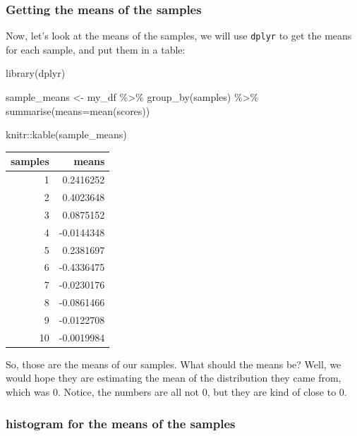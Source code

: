 \documentclass[
]{book}
\newenvironment{Shaded}{\begin{snugshade}}{\end{snugshade}}
\newcommand{\AttributeTok}[1]{\textcolor[rgb]{0.77,0.63,0.00}{#1}}
\newcommand{\FunctionTok}[1]{\textcolor[rgb]{0.00,0.00,0.00}{#1}}
\newcommand{\NormalTok}[1]{#1}
\newcommand{\OtherTok}[1]{\textcolor[rgb]{0.56,0.35,0.01}{#1}}
\newcommand{\SpecialCharTok}[1]{\textcolor[rgb]{0.00,0.00,0.00}{#1}}
\begin{document}
\hypertarget{getting-the-means-of-the-samples}{%
\subsubsection{Getting the means of the samples}\label{getting-the-means-of-the-samples}}

Now, let's look at the means of the samples, we will use \texttt{dplyr} to get the means for each sample, and put them in a table:

\begin{Shaded}
\begin{Highlighting}[]
\FunctionTok{library}\NormalTok{(dplyr)}

\NormalTok{sample\_means }\OtherTok{\textless{}{-}}\NormalTok{ my\_df }\SpecialCharTok{\%\textgreater{}\%}
                \FunctionTok{group\_by}\NormalTok{(samples) }\SpecialCharTok{\%\textgreater{}\%}
                \FunctionTok{summarise}\NormalTok{(}\AttributeTok{means=}\FunctionTok{mean}\NormalTok{(scores))}

\NormalTok{knitr}\SpecialCharTok{::}\FunctionTok{kable}\NormalTok{(sample\_means)}
\end{Highlighting}
\end{Shaded}

\begin{tabular}{r|r}
\hline
samples & means\\
\hline
1 & 0.2416252\\
\hline
2 & 0.4023648\\
\hline
3 & 0.0875152\\
\hline
4 & -0.0144348\\
\hline
5 & 0.2381697\\
\hline
6 & -0.4336475\\
\hline
7 & -0.0230176\\
\hline
8 & -0.0861466\\
\hline
9 & -0.0122708\\
\hline
10 & -0.0019984\\
\hline
\end{tabular}

So, those are the means of our samples. What should the means be? Well, we would hope they are estimating the mean of the distribution they came from, which was 0. Notice, the numbers are all not 0, but they are kind of close to 0.

\hypertarget{histogram-for-the-means-of-the-samples}{%
\subsubsection{histogram for the means of the samples}\label{histogram-for-the-means-of-the-samples}}
\end{document}

